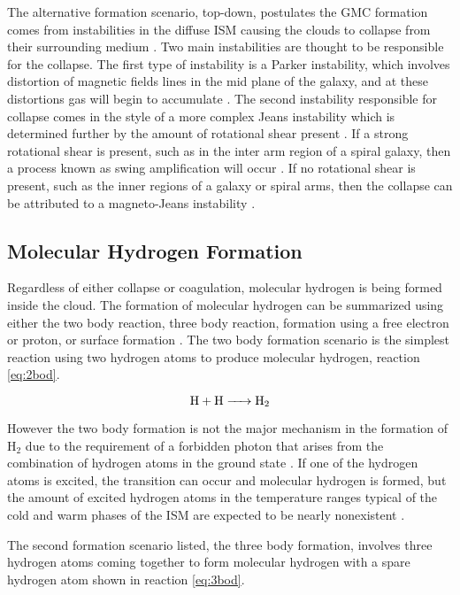 The alternative formation scenario, top-down, postulates the GMC formation comes from instabilities in the diffuse ISM causing the clouds to collapse from their surrounding medium \citep{mckee2007}.  Two main instabilities are thought to be responsible for the collapse.  The first type of instability is a Parker instability, which involves distortion of magnetic fields lines in the mid plane of the galaxy, and at these distortions gas will begin to accumulate \citep{parker1966, dobbs2013}.  The second instability responsible for collapse comes in the style of a more complex Jeans instability which is determined further by the amount of rotational shear present \citep{mckee2007}.  If a strong rotational shear is present, such as in the inter arm region of a spiral galaxy, then a process known as swing amplification will occur \citep{mckee2007}.  If no rotational shear is present, such as the inner regions of a galaxy or spiral arms, then the collapse can be attributed to a magneto-Jeans instability \citep{elmegreen1987,kim2001}.

\subsection{Molecular Hydrogen Formation}\label{h2form}

Regardless of either collapse or coagulation, molecular hydrogen is being formed inside the cloud.  The formation of molecular hydrogen can be summarized using either the two body reaction, three body reaction, formation using a free electron or proton, or surface formation \citep{krumholz2014}.  The two body formation scenario is the simplest reaction using two hydrogen atoms to produce molecular hydrogen, reaction \ref{eq:2bod}.

\begin{equation}\label{eq:2bod}
  \ce{H + H -> H_2}
\end{equation}

However the two body formation is not the major mechanism in the formation of H$_2$ due to the requirement of a forbidden photon that arises from the combination of hydrogen atoms in the ground state \citep{gould1963}.  If one of the hydrogen atoms is excited, the transition can occur and molecular hydrogen is formed, but the amount of excited hydrogen atoms in the temperature ranges typical of the cold and warm phases of the ISM are expected to be nearly nonexistent \citep{krumholz2014}.

The second formation scenario listed, the three body formation, involves three hydrogen atoms coming together to form molecular hydrogen with a spare hydrogen atom shown in reaction \ref{eq:3bod}.


